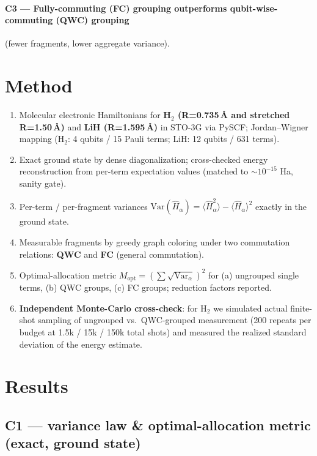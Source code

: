 \documentclass[11pt]{article}
\begin{document}
\paragraph{C3 --- Fully-commuting (FC) grouping outperforms qubit-wise-commuting
(QWC) grouping} (fewer fragments, lower aggregate variance).

\section{Method}

\begin{enumerate}
\item Molecular electronic Hamiltonians for \textbf{H$_2$ (R=0.735\,\AA{} and
  stretched R=1.50\,\AA)} and \textbf{LiH (R=1.595\,\AA)} in STO-3G via PySCF;
  Jordan--Wigner mapping (H$_2$: 4 qubits / 15 Pauli terms; LiH: 12 qubits /
  631 terms).
\item Exact ground state by dense diagonalization; cross-checked energy
  reconstruction from per-term expectation values (matched to
  $\sim 10^{-15}$ Ha, sanity gate).
\item Per-term / per-fragment variances
  $\mathrm{Var}(\hat H_\alpha) = \langle \hat H_\alpha^2 \rangle
  - \langle \hat H_\alpha \rangle^2$ exactly in the ground state.
\item Measurable fragments by greedy graph coloring under two commutation
  relations: \textbf{QWC} and \textbf{FC} (general commutation).
\item Optimal-allocation metric $M_{\mathrm{opt}} = (\sum \sqrt{\mathrm{Var}_\alpha})^2$
  for (a) ungrouped single terms, (b) QWC groups, (c) FC groups; reduction
  factors reported.
\item \textbf{Independent Monte-Carlo cross-check}: for H$_2$ we simulated
  actual finite-shot sampling of ungrouped vs.\ QWC-grouped measurement
  (200 repeats per budget at 1.5k / 15k / 150k total shots) and measured
  the realized standard deviation of the energy estimate.
\end{enumerate}

\section{Results}

\subsection*{C1 --- variance law \& optimal-allocation metric (exact, ground state)}
\end{document}
